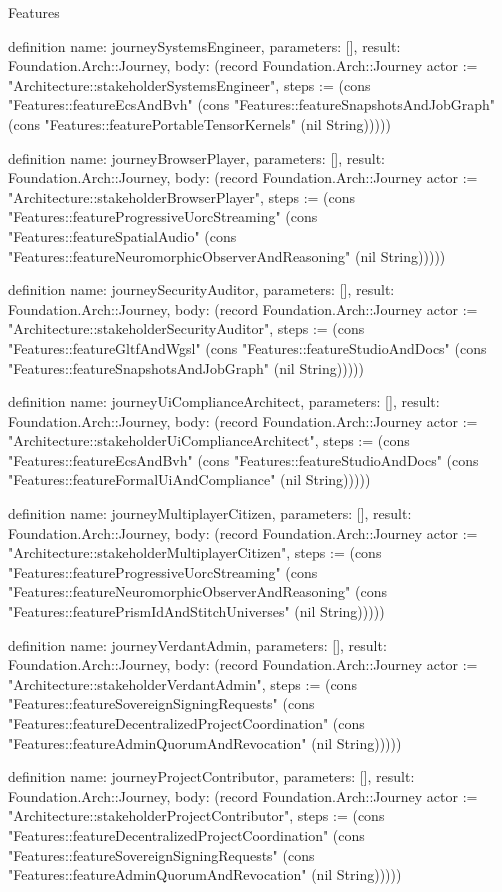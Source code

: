 \begin{lexlean}{Features}
\begin{semanticmodule}
definition{
  name: journeySystemsEngineer,
  parameters: [],
  result: Foundation.Arch::Journey,
  body: (record Foundation.Arch::Journey {actor := "Architecture::stakeholderSystemsEngineer", steps := (cons "Features::featureEcsAndBvh" (cons "Features::featureSnapshotsAndJobGraph" (cons "Features::featurePortableTensorKernels" (nil String))))})
}

definition{
  name: journeyBrowserPlayer,
  parameters: [],
  result: Foundation.Arch::Journey,
  body: (record Foundation.Arch::Journey {actor := "Architecture::stakeholderBrowserPlayer", steps := (cons "Features::featureProgressiveUorcStreaming" (cons "Features::featureSpatialAudio" (cons "Features::featureNeuromorphicObserverAndReasoning" (nil String))))})
}

definition{
  name: journeySecurityAuditor,
  parameters: [],
  result: Foundation.Arch::Journey,
  body: (record Foundation.Arch::Journey {actor := "Architecture::stakeholderSecurityAuditor", steps := (cons "Features::featureGltfAndWgsl" (cons "Features::featureStudioAndDocs" (cons "Features::featureSnapshotsAndJobGraph" (nil String))))})
}

definition{
  name: journeyUiComplianceArchitect,
  parameters: [],
  result: Foundation.Arch::Journey,
  body: (record Foundation.Arch::Journey {actor := "Architecture::stakeholderUiComplianceArchitect", steps := (cons "Features::featureEcsAndBvh" (cons "Features::featureStudioAndDocs" (cons "Features::featureFormalUiAndCompliance" (nil String))))})
}

definition{
  name: journeyMultiplayerCitizen,
  parameters: [],
  result: Foundation.Arch::Journey,
  body: (record Foundation.Arch::Journey {actor := "Architecture::stakeholderMultiplayerCitizen", steps := (cons "Features::featureProgressiveUorcStreaming" (cons "Features::featureNeuromorphicObserverAndReasoning" (cons "Features::featurePrismIdAndStitchUniverses" (nil String))))})
}

definition{
  name: journeyVerdantAdmin,
  parameters: [],
  result: Foundation.Arch::Journey,
  body: (record Foundation.Arch::Journey {actor := "Architecture::stakeholderVerdantAdmin", steps := (cons "Features::featureSovereignSigningRequests" (cons "Features::featureDecentralizedProjectCoordination" (cons "Features::featureAdminQuorumAndRevocation" (nil String))))})
}

definition{
  name: journeyProjectContributor,
  parameters: [],
  result: Foundation.Arch::Journey,
  body: (record Foundation.Arch::Journey {actor := "Architecture::stakeholderProjectContributor", steps := (cons "Features::featureDecentralizedProjectCoordination" (cons "Features::featureSovereignSigningRequests" (cons "Features::featureAdminQuorumAndRevocation" (nil String))))})
}


\end{semanticmodule}
\end{lexlean}
